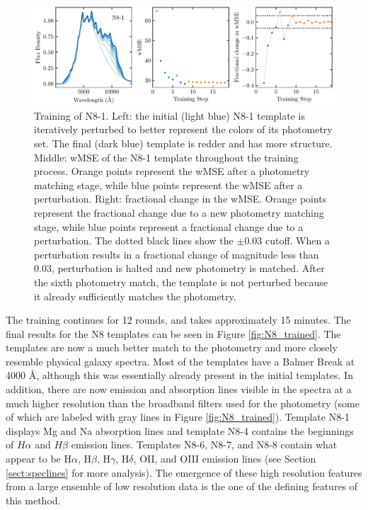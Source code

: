 \begin{figure}
    \centering
    \includegraphics{figures/N8_1_training_history.pdf}
    \caption{Training of N8-1. Left: the initial (light blue) N8-1 template is iteratively perturbed to better represent the colors of its photometry set. The final (dark blue) template is redder and has more structure. Middle: wMSE of the N8-1 template throughout the training process. Orange points represent the wMSE after a photometry matching stage, while blue points represent the wMSE after a perturbation. Right: fractional change in the wMSE. Orange points represent the fractional change due to a new photometry matching stage, while blue points represent a fractional change due to a perturbation. The dotted black lines show the $\pm 0.03$ cutoff. When a perturbation results in a fractional change of magnitude less than 0.03, perturbation is halted and new photometry is matched. After the sixth photometry match, the template is not perturbed because it already sufficiently matches the photometry.}
    \label{fig:training}
\end{figure}

The training continues for 12 rounds, and takes approximately 15 minutes.
The final results for the N8 templates can be seen in Figure \ref{fig:N8_trained}.
The templates are now a much better match to the photometry and more closely resemble physical galaxy spectra.
Most of the templates have a Balmer Break at 4000 \AA, although this was essentially already present in the initial templates.
In addition, there are now emission and absorption lines visible in the spectra at a much higher resolution than the broadband filters used for the photometry (some of which are labeled with gray lines in Figure \ref{fig:N8_trained}).
Template N8-1 displays Mg and Na absorption lines and template N8-4 contains the beginnings of $H\alpha$ and $H\beta$ emission lines.
Templates N8-6, N8-7, and N8-8 contain what appear to be H$\alpha$, H$\beta$, H$\gamma$, H$\delta$, OII, and OIII emission lines (see Section \ref{sect:speclines} for more analysis).
The emergence of these high resolution features from a large ensemble of low resolution data is the one of the defining features of this method.

